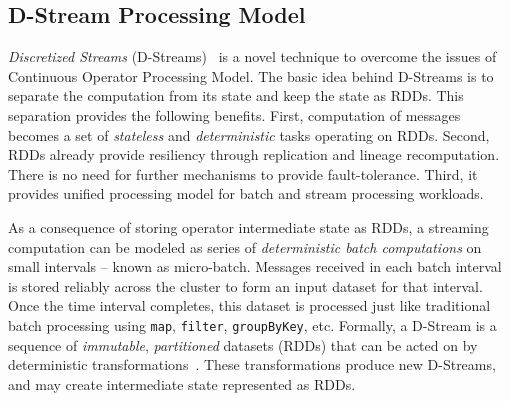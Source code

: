 \subsection{D-Stream Processing Model}
\label{sp:dstream-model}

\emph{Discretized Streams} (D-Streams)~\cite{Zaharia:2013} is a novel technique to overcome the issues of Continuous Operator Processing Model. The basic idea behind D-Streams is to separate the computation from its state and keep the state as RDDs. This separation provides the following benefits. First, computation of messages becomes a set of \emph{stateless} and \emph{deterministic} tasks operating on RDDs. Second, RDDs already provide resiliency through replication and lineage recomputation. There is no need for further mechanisms to provide fault-tolerance. Third, it provides unified processing model for batch and stream processing workloads.

As a consequence of storing operator intermediate state as RDDs, a streaming computation can be modeled as series of \emph{deterministic batch computations} on small intervals -- known as micro-batch. Messages received in each batch interval is stored reliably across the cluster to form an input dataset for that interval. Once the time interval completes, this dataset is processed just like traditional batch processing using \lstinline$map$, \lstinline$filter$, \lstinline$groupByKey$, etc. Formally, a D-Stream is a sequence of \emph{immutable}, \emph{partitioned} datasets (RDDs) that can be acted on by deterministic transformations~\cite{Zaharia:2013}. These  transformations produce new D-Streams, and may create intermediate state represented as RDDs.

